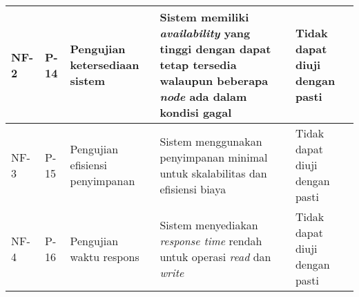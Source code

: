 \begin{longtable}{|p{2cm}|p{2cm}|p{3cm}|p{3cm}|p{2cm}|}
NF-2 & P-14 & Pengujian ketersediaan sistem & Sistem memiliki \textit{availability} yang tinggi dengan dapat tetap tersedia walaupun beberapa \textit{node} ada dalam kondisi gagal & Tidak dapat diuji dengan pasti \\ \hline
NF-3 & P-15 & Pengujian efisiensi penyimpanan & Sistem menggunakan penyimpanan minimal untuk skalabilitas dan efisiensi biaya & Tidak dapat diuji dengan pasti \\ \hline
NF-4 & P-16 & Pengujian waktu respons & Sistem menyediakan \textit{response time} rendah untuk operasi \textit{read} dan \textit{write} & Tidak dapat diuji dengan pasti \\ \hline
\end{longtable}